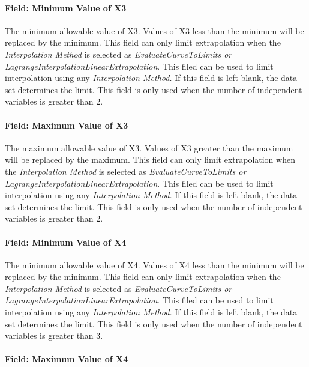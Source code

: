 \paragraph{Field: Minimum Value of X3}\label{field-minimum-value-of-x3}

The minimum allowable value of X3. Values of X3 less than the minimum will be replaced by the minimum. This field can only limit extrapolation when the \emph{Interpolation Method} is selected as \emph{EvaluateCurveToLimits or LagrangeInterpolationLinearExtrapolation}. This filed can be used to limit interpolation using any \emph{Interpolation Method.} If this field is left blank, the data set determines the limit. This field is only used when the number of independent variables is greater than 2.

\paragraph{Field: Maximum Value of X3}\label{field-maximum-value-of-x3}

The maximum allowable value of X3. Values of X3 greater than the maximum will be replaced by the maximum. This field can only limit extrapolation when the \emph{Interpolation Method} is selected as \emph{EvaluateCurveToLimits or LagrangeInterpolationLinearExtrapolation}. This filed can be used to limit interpolation using any \emph{Interpolation Method.} If this field is left blank, the data set determines the limit. This field is only used when the number of independent variables is greater than 2.

\paragraph{Field: Minimum Value of X4}\label{field-minimum-value-of-x4}

The minimum allowable value of X4. Values of X4 less than the minimum will be replaced by the minimum. This field can only limit extrapolation when the \emph{Interpolation Method} is selected as \emph{EvaluateCurveToLimits or LagrangeInterpolationLinearExtrapolation}. This filed can be used to limit interpolation using any \emph{Interpolation Method.} If this field is left blank, the data set determines the limit. This field is only used when the number of independent variables is greater than 3.

\paragraph{Field: Maximum Value of X4}\label{field-maximum-value-of-x4}

